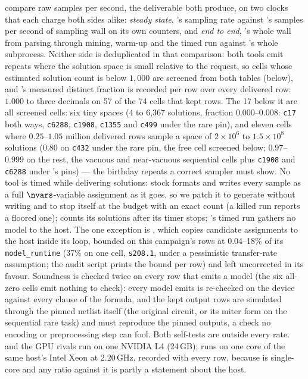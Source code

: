 compare raw samples per second, the deliverable both produce, on two clocks that each charge
both sides alike: \emph{steady state}, \gpap{}'s sampling rate against \cmsgen{}'s samples per
second of sampling wall on its own counters, and \emph{end to end}, \gpap{}'s whole wall from
parsing through mining, warm-up and the timed run against \cmsgen{}'s whole subprocess.
Neither side is deduplicated in that comparison: both tools emit repeats where the solution
space is small relative to the request, so cells whose estimated solution count is below
$1{,}000$ are screened from both tables (below), and \gpap{}'s measured distinct fraction is
recorded per row over every delivered row: $1.000$ to three decimals on 57 of the 74 cells
that kept rows. The 17 below it are all screened cells: six tiny spaces (4 to 6{,}367
solutions, fraction $0.000$--$0.008$: \texttt{c17} both ways, \texttt{c6288}, \texttt{c1908},
\texttt{c1355} and \texttt{c499} under the rare pin), and eleven cells where $0.25$--$1.05$
million delivered rows sample a space of $2\times10^{6}$ to $1.5\times10^{8}$ solutions
($0.80$ on \texttt{c432} under the rare pin, the free cell screened below; $0.97$--$0.999$ on
the rest, the vacuous and near-vacuous sequential cells plus \texttt{c1908} and \texttt{c6288}
under \demotic{}'s pins) --- the birthday repeats a correct sampler must show. No tool is timed while
delivering solutions: stock \cmsgen{} formats and writes every sample as a full
$\nvars$-variable assignment as it goes, so we patch it to generate without writing and to
stop itself at the budget with an exact count (a killed run reports a floored one);
\demotic{} counts its solutions after its timer stops; \gpap{}'s timed run gathers no model to
the host. The one exception is \recurrent{}, which copies candidate assignments to the host
inside its loop, bounded on this campaign's rows at 0.04--18\% of its \texttt{model\_runtime}
(37\% on one cell, \texttt{s208.1}, under a pessimistic transfer-rate assumption; the audit
script prints the bound per row) and left uncorrected in its favour.
Soundness is checked twice on every row that emits a model (the six all-zero cells emit
nothing to check): every model \gpap{} emits is re-checked on the
device against every clause of the formula, and the kept output rows are simulated through
the pinned netlist itself (the original circuit, or its miter form on the sequential rare
task) and must reproduce the pinned outputs, a check no encoding or preprocessing step can
fool. Both self-tests are outside every rate. \gpap{} and the GPU
rivals run on one NVIDIA L4 (24\,GB); \cmsgen{} runs on one core of the same host's Intel Xeon
at 2.20\,GHz, recorded with every row, because \cmsgen{} is single-core and any ratio against
it is partly a statement about the host.


